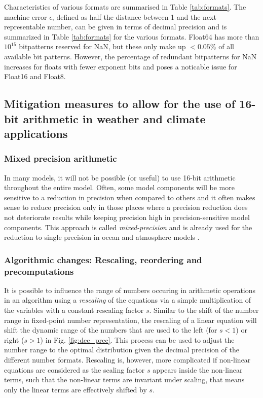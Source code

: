 \documentclass[draft]{agujournal2019}
\begin{document}
Characteristics of various formats are summarised in Table \ref{tab:formats}. The machine error $\epsilon$, defined as half the distance between 1 and the next representable number, can be given in terms of decimal precision and is summarized in Table \ref{tab:formats} for the various formats. Float64 has more than $10^{15}$ bitpatterns reserved for NaN, but these only make up $< 0.05\%$ of all available bit patterns. However, the percentage of redundant bitpatterns for NaN increases for floats with fewer exponent bits and poses a noticable issue for Float16 and Float8.


\subsection{Mitigation measures to allow for the use of 16-bit arithmetic in weather and climate applications}

\subsubsection{Mixed precision arithmetic}

In many models, it will not be possible (or useful) to use 16-bit arithmetic throughout the entire model. Often, some model components will be more sensitive to a reduction in precision when compared to others and it often makes sense to reduce precision only in those places where a precision reduction does not deteriorate results while keeping precision high in precision-sensitive model components. This approach is called \emph{mixed-precision} and is already used for the reduction to single precision in ocean and atmosphere models \cite{Vana2017,TintoPrims2019}.

\subsubsection{Algorithmic changes: Rescaling, reordering and precomputations}

It is possible to influence the range of numbers occuring in arithmetic operations in an algorithm using a \emph{rescaling} of the equations via a simple multiplication of the variables with a constant rescaling factor $s$. Similar to the shift of the number range in fixed-point number representation, the rescaling of a linear equation will shift the dynamic range of the numbers that are used to the left (for $s < 1$) or right ($s > 1$) in Fig. \ref{fig:dec_prec}. This process can be used to adjust the number range to the optimal distribution given the decimal precision of the different number formats. Rescaling is, however, more complicated if non-linear equations are considered as the scaling factor $s$ appears inside the non-linear terms, such that the non-linear terms are invariant under scaling, that means only the linear terms are effectively shifted by $s$.
\end{document}
